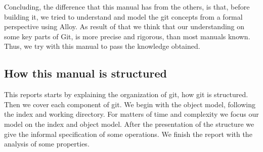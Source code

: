 Concluding, the difference that this manual has from the others, is
that, before building it, we tried to understand and model 
the git concepts from a formal perspective using Alloy. As result of that
we think that our understanding on some key parts of Git, is more precise
and rigorous, than most manuals known. Thus, we try with this manual
to pass the knowledge obtained. \par 

\subsection{How this manual is structured}
This reports starts by explaining the organization of git, how git is
structured. Then we cover each component of git. We begin with the
object model, following the index and working directory. For matters
of time and complexity we focus our model on the index and object
model. After the presentation of the structure we give the informal
specification of some operations. We finish the report with the
analysis of some properties.


